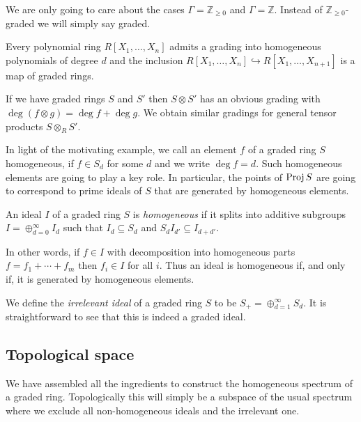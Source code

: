 \documentclass{article}
\begin{document}
We are only going to care about the cases $\Gamma=\mathbb{Z}_{\geq 0}$
and $\Gamma=\mathbb{Z}$. Instead of $\mathbb{Z}_{\geq 0}$-graded
we will simply say graded.

\begin{example}
  Every polynomial ring $R[X_1,\ldots,X_n]$ admits a grading into
  homogeneous polynomials of degree $d$ and the inclusion
  $R[X_1,\ldots,X_n] \hookrightarrow R[X_1,\ldots,X_{n+1}]$
  is a map of graded rings.
\end{example}

\begin{example}
  If we have graded rings $S$ and $S'$ then $S\otimes S'$ has an
  obvious grading with $\deg (f \otimes g) = \deg f + \deg g$.
  We obtain similar gradings for general tensor products
  $S\otimes_R S'$.
\end{example}

In light of the motivating example, we call an element
$f$ of a graded ring $S$ homogeneous, if $f\in S_d$ for some $d$
and we write $\deg f = d$.
Such homogeneous elements are going to play a key role. In particular,
the points of $\operatorname{Proj} S$ are going to correspond to prime ideals of $S$
that are generated by homogeneous elements.

\begin{definition}
  An ideal $I$ of a graded ring $S$ is \emph{homogeneous} if it splits into
  additive subgroups $I=\oplus_{d=0}^\infty I_d$ such that
  $I_d\subseteq S_d$ and $S_d I_{d'} \subseteq I_{d+d'}$.
\end{definition}

In other words, if $f\in I$ with decomposition into homogeneous parts
$f=f_1+\cdots + f_m$ then $f_i\in I$ for all $i$. Thus an ideal is
homogeneous if, and only if, it is generated by homogeneous elements.
\cite{boer1961}

\begin{example}
  We define the \emph{irrelevant ideal} of a graded ring $S$
  to be $S_+ = \oplus_{d=1}^\infty S_d$. It is straightforward to
  see that this is indeed a graded ideal.
\end{example}

\subsection{Topological space}

We have assembled all the ingredients to construct the homogeneous
spectrum of a graded ring. Topologically this will simply be a
subspace of the usual spectrum where we exclude all non-homogeneous
ideals and the irrelevant one.
\end{document}
